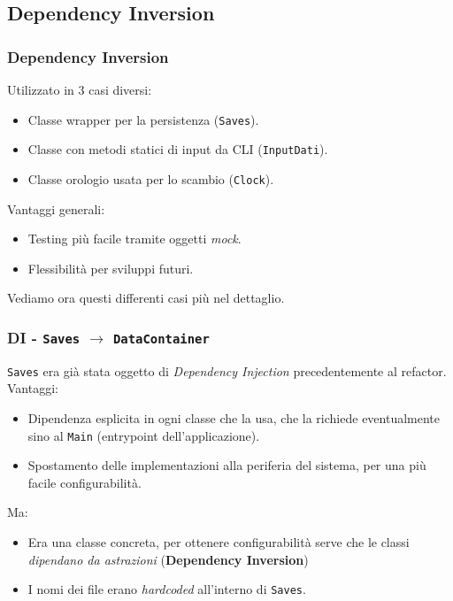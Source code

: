 \subsection{Dependency Inversion}
\begin{frame}
    \frametitle{Dependency Inversion}
    Utilizzato in 3 casi diversi:
    \begin{itemize}
        \item Classe wrapper per la persistenza (\texttt{Saves}).
        \item Classe con metodi statici di input da CLI (\texttt{InputDati}).
        \item Classe orologio usata per lo scambio (\texttt{Clock}).
    \end{itemize}
    Vantaggi generali:
    \begin{itemize}
        \item {\color{green}Testing più facile} tramite oggetti \emph{mock}.
        \item {\color{green}Flessibilità} per sviluppi futuri.
    \end{itemize}
    Vediamo ora questi differenti casi più nel dettaglio.
\end{frame}

\begin{frame}
    \frametitle{DI - \texttt{Saves} $\to$ \texttt{DataContainer}}
    \texttt{Saves} era già stata oggetto di \emph{Dependency Injection} precedentemente al refactor.
    {\color{green}Vantaggi}:
    \begin{itemize}
        \item {\color{green}Dipendenza esplicita} in ogni classe che la usa, che la richiede eventualmente sino al \texttt{Main}
        (entrypoint dell'applicazione).
        \item Spostamento delle implementazioni alla periferia del sistema, per una più {\color{green}facile configurabilità}.
    \end{itemize}

    Ma:
    \begin{itemize}
        \item Era una {\color{red}classe concreta}, per ottenere configurabilità serve che le classi \emph{dipendano da astrazioni}
        (\textbf{Dependency Inversion})
        \item I nomi dei file erano {\color{red}\emph{hardcoded}} all'interno di \texttt{Saves}.
    \end{itemize}
\end{frame}

